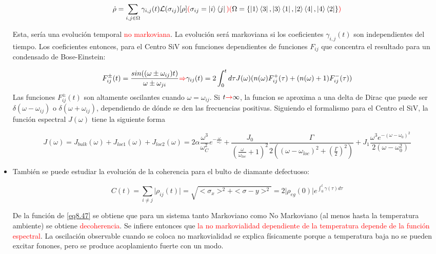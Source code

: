 \documentclass{book}
\begin{document}
\begin{itemize}
    \begin{equation}\label{eq8.44}\dot{\rho}=\sum_{i,j\in\Omega}\gamma_{i,j}(t)\mathcal{L}(\sigma_{ij})[\rho] \textcolor{red}{(}\sigma_{ij}=\ket{i}\bra{j}\textcolor{red}{)}\textcolor{red}{(}\Omega=\{\ket{1}\bra{3},\ket{3}\bra{1},\ket{2}\bra{4},\ket{4}\bra{2}\}\textcolor{red}{)}\end{equation}
    
    Esta, sería una evolución temporal \textcolor{red}{no markoviana}. La evolución será markoviana si los coeficientes $\gamma_{i,j}(t)$ son independientes del tiempo. Los coeficientes entonces, para el Centro SiV son funciones dependientes de funciones $F_{ij}$ que concentra el resultado para un condensado de Bose-Einstein:
    
    \begin{equation}\label{eq8.45} F_{ij}^\pm (t)=\frac{sin((\omega\pm\omega_{ij})t)}{\omega\pm\omega_{ji}}\textcolor{red}{\Rightarrow}\gamma_{ij}(t)=2\int_0^t d\tau J(\omega)(n(\omega) F_{ij}^+(\tau)+(n(\omega)+1)F_{ij}^-(\tau))
    \end{equation}
     Las funciones $F_{ij}^\pm(t)$ son altamente oscilantes cuando $\omega=\omega_{ij}$. Si $t\textcolor{red}{\rightarrow}\infty$, la funcion se aproxima a una delta de Dirac que puede ser $\delta(\omega-\omega_{ij})$ o $\delta(\omega+\omega_{ij})$, dependiendo de dónde se den las frecuencias positivas. Siguiendo el formalismo para el Centro el SiV, la función espectral $J(\omega)$ tiene la siguiente forma
     
     \begin{equation}\label{eq8.46}J(\omega)=J_{bulk}(\omega)+J_{loc1}(\omega)+J_{loc2}(\omega)=2\alpha\frac{\omega^3}{\omega_C^2}e^{-\frac{\omega}{\omega_C}}+\frac{J_0}{(\frac{\omega}{\omega_{loc}}+1)^2}\frac{\Gamma}{2((\omega-\omega_{loc})^2+(\frac{\Gamma}{2})^2)}+J_1\frac{\omega^3e^{-(\omega-\omega_0)^2}}{2(\omega-\omega_0^2)}\end{equation}
    \item También se puede estudiar la evolución de la coherencia para el bulto de diamante defectuoso:
    
    \begin{equation}\label{eq8.47}C(t)=\sum_{i\neq j}\lvert\rho_{ij}(t)\rvert=\sqrt{<\sigma_x>^2+<\sigma-y>^2}=2\lvert\rho_{eg}(0)\rvert e^{\int_0^t \gamma(\tau)d\tau}\end{equation}
    
    De la función de \ref{eq8.47} se obtiene que para un sistema tanto Markoviano como No Markoviano (al menos hasta la temperatura ambiente) se obtiene \textcolor{red}{decoherencia}. Se infiere entonces que \textcolor{red}{la no markovialidad dependiente de la temperatura depende de la función espectral}. La oscilación observable cuando se coloca no markovialidad se explica físicamente porque a temperatura baja no se pueden excitar fonones, pero se produce acoplamiento fuerte con un modo. 
\end{itemize}
\end{document}
